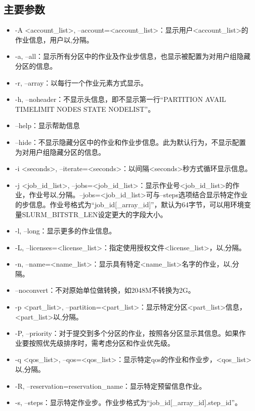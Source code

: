 \subsection{主要参数}
\begin{itemize}
	\item -A <account\_list>, --account=<account\_list>：显示用户<account\_list>的作业信息，用户以,分隔。
	\item -a, --all：显示所有分区中的作业及作业步信息，也显示被配置为对用户组隐藏分区的信息。
	\item -r, --array：以每行一个作业元素方式显示。
	\item -h, --noheader：不显示头信息，即不显示第一行``PARTITION AVAIL  TIMELIMIT  NODES  STATE NODELIST''。
	\item --help：显示帮助信息
	\item --hide：不显示隐藏分区中的作业和作业步信息。此为默认行为，不显示配置为对用户组隐藏分区的信息。
	\item -i <seconds>, --iterate=<seconds>：以间隔<seconds>秒方式循环显示信息。
	\item -j <job\_id\_list>, --jobs=<job\_id\_list>：显示作业号<job\_id\_list>的作业，作业号以,分隔。--jobs=<job\_id\_list>可与--steps选项结合显示特定作业的步信息。作业号格式为``job\_id[\_array\_id]''，默认为64字节，可以用环境变量SLURM\_BITSTR\_LEN设定更大的字段大小。
	\item -l, --long：显示更多的作业信息。
	\item -L, --licenses=<license\_list>：指定使用授权文件<license\_list>，以,分隔。
	\item -n, --name=<name\_list>：显示具有特定<name\_list>名字的作业，以,分隔。
	\item --noconvert：不对原始单位做转换，如2048M不转换为2G。
	\item -p <part\_list>, --partition=<part\_list>：显示特定分区<part\_list>信息，<part\_list>以,分隔。
	\item -P, --priority：对于提交到多个分区的作业，按照各分区显示其信息。如果作业要按照优先级排序时，需考虑分区和作业优先级。
	\item -q <qos\_list>, --qos=<qos\_list>：显示特定qos的作业和作业步，<qos\_list>以,分隔。
	\item -R, --reservation=reservation\_name：显示特定预留信息作业。
	\item -s, --steps：显示特定作业步。作业步格式为``job\_id[\_array\_id].step\_id''。

\end{itemize}
